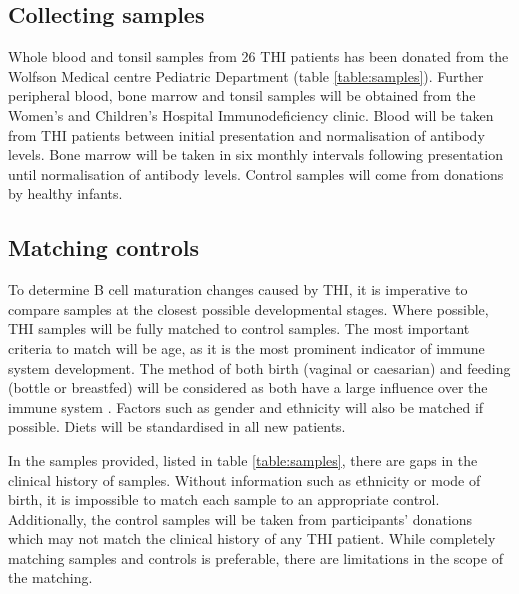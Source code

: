 \documentclass[12pt]{article}
\begin{document}
		\subsection{Collecting samples}
			
			Whole blood and tonsil samples from 26 THI patients has been donated from the Wolfson Medical centre Pediatric Department (table \ref{table:samples}).
			Further peripheral blood, bone marrow and tonsil samples will be obtained from the Women's and Children's Hospital Immunodeficiency clinic. 
			Blood will be taken from THI patients between initial presentation and normalisation of antibody levels.
			Bone marrow will be taken in six monthly intervals following presentation until normalisation of antibody levels.
			Control samples will come from donations by healthy infants. 
			
		\subsection{Matching controls} 
		
			To determine B cell maturation changes caused by THI, it is imperative to compare samples at the closest possible developmental stages.
			Where possible, THI samples will be fully matched to control samples. 
			The most important criteria to match will be age, as it is the most prominent indicator of immune system development. 
			The method of both birth (vaginal or caesarian) and feeding (bottle or breastfed) will be considered as both have a large influence over the immune system \citep{Jakobsson14,Cho13,Brandtzaeg03,Rogier14,Gomez14}.
			Factors such as gender and ethnicity will also be matched if possible. 
			Diets will be standardised in all new patients.
	
			In the samples provided, listed in table \ref{table:samples}, there are gaps in the clinical history of samples.
			Without information such as ethnicity or mode of birth, it is impossible to match each sample to an appropriate control. 
			Additionally, the control samples will be taken from participants' donations which may not match the clinical history of any THI patient.
			While completely matching samples and controls is preferable, there are limitations in the scope of the matching. 
	
\end{document}
